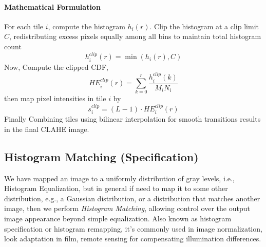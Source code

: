 \paragraph{Mathematical Formulation}

For each tile \( i \), compute the histogram \( h_i(r) \). Clip the histogram at a clip limit \( C \), redistributing excess pixels equally among all bins to maintain total histogram count
\[
h_i^{clip}(r) = \min(h_i(r), C)
\]
Now, Compute the clipped CDF,
\[
HE_i^{clip}(r) = \sum_{k=0}^{r} \frac{h_i^{clip}(k)}{M_i N_i}
\]
then map pixel intensities in tile \( i \) by
\[
s_i^{clip} = (L-1) \cdot HE_i^{clip}(r)
\]
Finally Combining tiles using bilinear interpolation for smooth transitions results in the final CLAHE image.


\subsection{Histogram Matching (Specification)}

We have mapped an image to a uniformly distribution of gray levels, i.e., Histogram Equalization, but in general if need to map it to some other distribution, e.g., a Gaussian distribution, or a distribution that matches another image, then we perform {\it Histogram Matching}, allowing control over the output image appearance beyond simple equalization. Also known as histogram specification or histogram remapping, it's commonly used in image normalization, look adaptation in film, remote sensing for compensating illumination differences.



